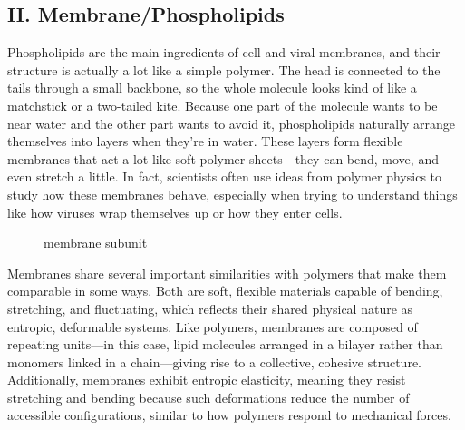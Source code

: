 \documentclass[12pt]{article}
\begin{document}
\begin{flushleft}
\subsection*{II. Membrane/Phospholipids}
Phospholipids are the main ingredients of cell and viral membranes, and their structure is actually a lot like a simple polymer. The head is connected to the tails through a small backbone, so the whole molecule looks kind of like a matchstick or a two-tailed kite. Because one part of the molecule wants to be near water and the other part wants to avoid it, phospholipids naturally arrange themselves into layers when they’re in water. These layers form flexible membranes that act a lot like soft polymer sheets—they can bend, move, and even stretch a little. In fact, scientists often use ideas from polymer physics to study how these membranes behave, especially when trying to understand things like how viruses wrap themselves up or how they enter cells.
\begin{figure}[!ht]
  \centering
  \caption{membrane subunit}
\end{figure}



Membranes share several important similarities with polymers that make them comparable in some ways. Both are soft, flexible materials capable of bending, stretching, and fluctuating, which reflects their shared physical nature as entropic, deformable systems. Like polymers, membranes are composed of repeating units—in this case, lipid molecules arranged in a bilayer rather than monomers linked in a chain—giving rise to a collective, cohesive structure. Additionally, membranes exhibit entropic elasticity, meaning they resist stretching and bending because such deformations reduce the number of accessible configurations, similar to how polymers respond to mechanical forces.



\end{flushleft}
\end{document}
